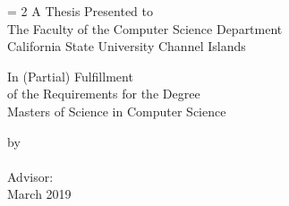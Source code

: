 \begin{titlepage}
\begin{center}
{\Large \bfseries \thesistitle \par}

\vspace{2 cm}
\baselineskip = 2\baselineskip
A Thesis Presented to \\
The Faculty of the Computer Science Department\\
California State University Channel Islands

\vspace{1 cm}

In (Partial) Fulfillment\\
of the Requirements for the Degree\\
Masters of Science in Computer Science\\

\vspace{1 cm }

\vfill

by \\
\studentname\\
Advisor: \advisorname\\
March 2019
\end{center}
\end{titlepage}